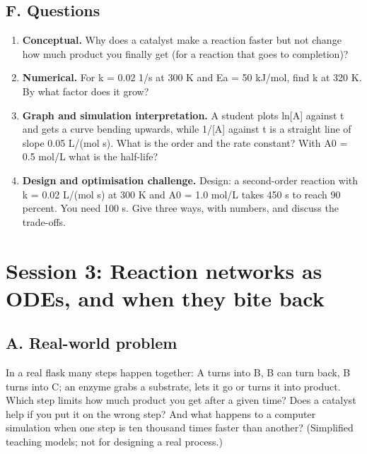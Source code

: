 \documentclass[11pt,a4paper]{article}
\begin{document}
\subsection*{F. Questions}
\begin{enumerate}[nosep]
\item \textbf{Conceptual.} Why does a catalyst make a reaction faster but not change how much product you finally get (for a reaction that goes to completion)?
\item \textbf{Numerical.} For k = 0.02 1/s at 300 K and Ea = 50 kJ/mol, find k at 320 K. By what factor does it grow?
\item \textbf{Graph and simulation interpretation.} A student plots ln[A] against t and gets a curve bending upwards, while 1/[A] against t is a straight line of slope 0.05 L/(mol s). What is the order and the rate constant? With A0 = 0.5 mol/L what is the half-life?
\item \textbf{Design and optimisation challenge.} Design: a second-order reaction with k = 0.02 L/(mol s) at 300 K and A0 = 1.0 mol/L takes 450 s to reach 90 percent. You need 100 s. Give three ways, with numbers, and discuss the trade-offs.
\end{enumerate}

\section{Session 3: Reaction networks as ODEs, and when they bite back}

\subsection*{A. Real-world problem}
In a real flask many steps happen together: A turns into B, B can turn back, B turns into C; an enzyme grabs a substrate, lets it go or turns it into product. Which step limits how much product you get after a given time? Does a catalyst help if you put it on the wrong step? And what happens to a computer simulation when one step is ten thousand times faster than another? (Simplified teaching models; not for designing a real process.)
\end{document}
